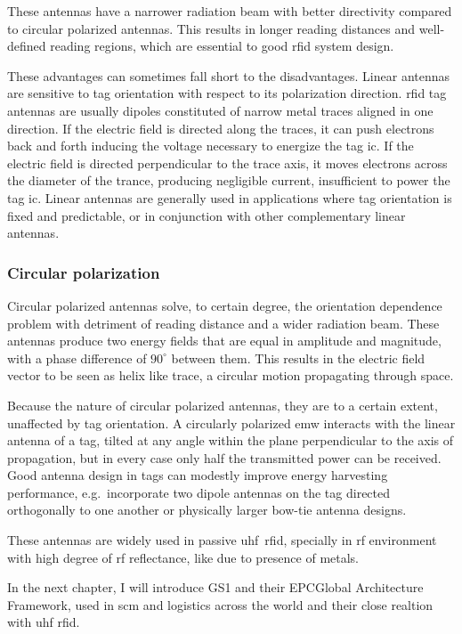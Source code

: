 These antennas have a narrower radiation beam with better directivity compared to circular polarized antennas. This results in longer reading distances and well-defined reading regions, which are essential to good \ac{rfid} system design.

These advantages can sometimes fall short to the disadvantages. Linear antennas are sensitive to tag orientation with respect to its polarization direction. 
\ac{rfid} tag antennas are usually dipoles constituted of narrow metal traces aligned in one direction. If the electric field is directed along the traces, it can push electrons back and forth inducing the voltage necessary to energize the tag \ac{ic}. If the electric field is directed perpendicular to the trace axis, it moves electrons across the diameter of the trance, producing negligible current, insufficient to power the tag \ac{ic}.
Linear antennas are generally used in applications where tag orientation is fixed and predictable, or in conjunction with other complementary linear antennas.

\subsubsection{Circular polarization}

Circular polarized antennas solve, to certain degree, the orientation dependence problem with detriment of reading distance and a wider radiation beam.
These antennas produce two energy fields that are equal in amplitude and magnitude, with a phase difference of $90^\circ$ between them. This results in the electric field vector to be seen as helix like trace, a circular motion propagating through space. 

Because the nature of circular polarized antennas, they are to a certain extent, unaffected by tag orientation.
A circularly polarized \ac{emw} interacts with the linear antenna of a tag, tilted at any angle within the plane perpendicular to the axis of propagation, but in every case only half the transmitted power can be received.
Good antenna design in tags can modestly improve energy harvesting performance, e.g.\ incorporate two dipole antennas on the tag directed orthogonally to one another or physically larger bow-tie antenna designs.

These antennas are widely used in passive \acs{uhf}~\acs{rfid}, specially in \ac{rf} environment with high degree of \ac{rf} reflectance, like due to presence of metals.


In the next chapter, I will introduce GS1 and their EPCGlobal Architecture Framework, used in \ac{scm} and logistics across the world and their close realtion with \ac{uhf} \ac{rfid}.  

\cleardoublepage